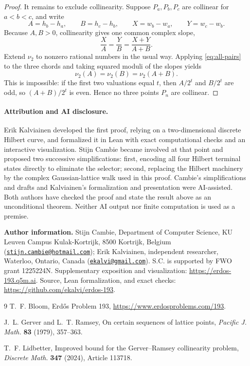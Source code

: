 \documentclass[10pt]{article}
\newcommand{\vTwo}{\nu_2}
\begin{document}
\begin{proof}
It remains to exclude collinearity.  Suppose $P_a,P_b,P_c$ are collinear for
$a<b<c$, and write
\[
 A=h_b-h_a,\qquad B=h_c-h_b,
 \qquad X=w_b-w_a,\qquad Y=w_c-w_b.
\]
Because $A,B>0$, collinearity gives one common complex slope,
\[
 \frac XA=\frac YB=\frac{X+Y}{A+B}.
\]
Extend $\vTwo$ to nonzero rational numbers in the usual way.  Applying
\eqref{eq:all-pairs} to the three chords and taking squared moduli of the
slopes yields
\[
 \vTwo(A)=\vTwo(B)=\vTwo(A+B).
\]
This is impossible: if the first two valuations equal $t$, then $A/2^t$ and
$B/2^t$ are odd, so $(A+B)/2^t$ is even.  Hence no three points $P_n$ are
collinear.
\end{proof}

\paragraph{Attribution and AI disclosure.}
Erik Kalviainen developed the first proof, relying on a two-dimensional
discrete Hilbert curve, and formalized it in Lean with exact computational
checks and an interactive visualization.  Stijn Cambie became involved at that
point and proposed two successive simplifications: first, encoding all four
Hilbert terminal states directly to eliminate the selector; second, replacing
the Hilbert machinery by the complex Gaussian-lattice walk used in this proof.
Cambie's simplifications and drafts and Kalviainen's formalization and
presentation were AI-assisted.  Both authors have checked the proof and state
the result above as an unconditional theorem.  Neither AI output nor finite
computation is used as a premise.

{\footnotesize\raggedright
\noindent\textbf{Author information.}
Stijn Cambie, Department of Computer Science, KU Leuven Campus
Kulak-Kortrijk, 8500 Kortrijk, Belgium
(\href{mailto:stijn.cambie@hotmail.com}{\nolinkurl{stijn.cambie@hotmail.com}});
Erik Kalviainen, independent researcher, Waterloo, Ontario, Canada
(\href{mailto:ekalvi@gmail.com}{\nolinkurl{ekalvi@gmail.com}}).
S.C. is supported by FWO grant 1225224N.
Supplementary exposition and visualization: \url{https://erdos-193.q5m.ai}.
Source, Lean formalization, and exact checks:
\url{https://github.com/ekalvi/erdos-193}.\par}

\begin{thebibliography}{9}
T.~F. Bloom, Erd\H{o}s Problem 193,
\url{https://www.erdosproblems.com/193}.

J.~L. Gerver and L.~T. Ramsey,
On certain sequences of lattice points,
\emph{Pacific J. Math.} \textbf{83} (1979), 357--363.

T.~F. Lidbetter,
Improved bound for the Gerver--Ramsey collinearity problem,
\emph{Discrete Math.} \textbf{347} (2024), Article 113718.
\end{thebibliography}
\end{document}
